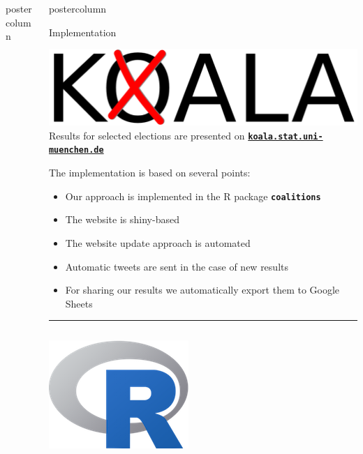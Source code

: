 \documentclass[final,hyperref={pdfpagelabels=false}]{beamer}
\let\olditem\item
\renewcommand\item{\justifying\olditem} %
\newcommand{\bfBlue}[1]{\textcolor{koaladarkestblue}{\textbf{#1}}}
\newcommand*\circled[1]{\tikz[baseline=(char.base)]{
\node[shape=circle,draw,inner sep=2pt] (char) {#1};}}
\begin{document}
\begin{frame}
\begin{columns}
\begin{column}{1\textwidth}
\begin{columns}[T]
\begin{column}{.484\textwidth}
\begin{beamercolorbox}[center,wd=\textwidth]{postercolumn}
\begin{minipage}[T]{.95\textwidth}
\end{minipage}
\end{beamercolorbox}
\end{column}

\begin{column}{.484\textwidth}
\begin{beamercolorbox}[center,wd=\textwidth]{postercolumn}
\begin{minipage}[T]{.95\textwidth}  %


\begin{block}{\footnotesize \circled{3} Implementation}
\begin{center}\centering
\includegraphics[height=5ex]{figures/Koala_Logo_ohneSchrift}
\\[2ex]
Results for selected elections are presented on
\bfBlue{\texttt{\href{http://koala.stat.uni-muenchen.de}{koala.stat.uni-muenchen.de}}}
\end{center}
\vspace{2ex}
The implementation is based on several points:
\begin{itemize}
  \item Our approach is implemented in the R package \bfBlue{\texttt{coalitions}} 
  \item The website is shiny-based
  \item The website update approach is automated
  \item Automatic tweets are sent in the case of new results
  \item For sharing our results we automatically export them to Google Sheets
\end{itemize}

\vspace{1ex}
\textcolor{LMUlightgray}{\hrule{}}
\vspace{1ex}
\begin{columns}[t]
  \begin{column}{.15\textwidth}
  \begin{center}\centering
  \includegraphics[height=5ex]{figures/implementation_r}
  \end{center}
  \end{column}


\end{columns}
\end{block}
\end{minipage}
\end{beamercolorbox}
\end{column}
\end{columns}
\end{column}
\end{columns}
\end{frame}
\end{document}

